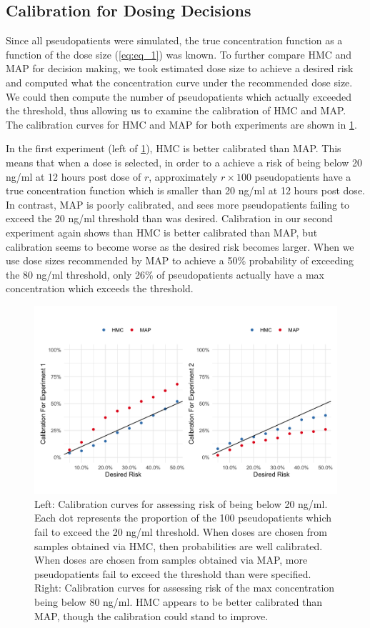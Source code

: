 \subsection*{Calibration for Dosing Decisions}

Since all pseudopatients were simulated, the true concentration function as a function of the dose size (\cref{eq:eq_1}) was known.  To further compare HMC and MAP for decision making, we took estimated dose size to achieve a desired risk and computed what the concentration curve under the recommended dose size.  We could then compute the number of pseudopatients which actually exceeded the threshold, thus allowing us to examine the calibration of HMC and MAP.  The calibration curves for HMC and MAP for both experiments are shown in \cref{fig:fig8}.

In the first experiment (left of \cref{fig:fig8}), HMC is better calibrated than MAP.  This means that when a dose is selected, in order to a achieve a risk of being below 20 ng/ml at 12 hours post dose of $r$, approximately $r \times 100$ pseudopatients have a true concentration function which is smaller than 20 ng/ml at 12 hours post dose. In contrast, MAP is poorly calibrated, and sees more pseudopatients failing to exceed the 20 ng/ml threshold than was desired.  Calibration in our second experiment again shows than HMC is better calibrated than MAP, but calibration seems to become worse as the desired risk becomes larger.  When we use dose sizes recommended by MAP to achieve a 50\% probability of exceeding the 80 ng/ml threshold, only 26\% of pseudopatients actually have a max concentration which exceeds the threshold.


\begin{figure}[h!]
	\centering
	\includegraphics[width=\linewidth]{figs/fig8.png}
	\caption{Left: Calibration curves for assessing risk of being below 20 ng/ml.  Each dot represents the proportion of the 100 pseudopatients which fail to exceed the 20 ng/ml threshold.  When doses are chosen from samples obtained via HMC, then probabilities are well calibrated. When doses are chosen from samples obtained via MAP, more pseudopatients fail to exceed the threshold than were specified.  Right: Calibration curves for assessing risk of the max concentration being below 80 ng/ml. HMC appears to be better calibrated than MAP, though the calibration could stand to improve.}
	\label{fig:fig8}
\end{figure}



